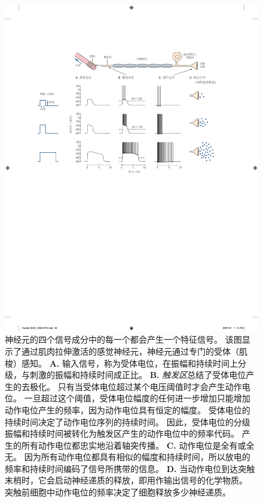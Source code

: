 \begin{figure}[htbp]
	\centering
	\includegraphics[width=1.0\linewidth]{chap03/fig_3_9}
	\caption{神经元的四个信号成分中的每一个都会产生一个特征信号。
		该图显示了通过肌肉拉伸激活的感觉神经元，神经元通过专门的受体（肌梭）感知。 
		\textbf{A.} 输入信号，称为受体电位，在振幅和持续时间上分级，与刺激的振幅和持续时间成正比。 
		\textbf{B.} \textit{触发区}总结了受体电位产生的去极化。
		只有当受体电位超过某个电压阈值时才会产生动作电位。
		一旦超过这个阈值，受体电位幅度的任何进一步增加只能增加动作电位产生的频率，因为动作电位具有恒定的幅度。
		受体电位的持续时间决定了动作电位序列的持续时间。
		因此，受体电位的分级振幅和持续时间被转化为触发区产生的动作电位中的频率代码。
		产生的所有动作电位都忠实地沿着轴突传播。
		\textbf{C.} 动作电位是全有或全无。
		因为所有动作电位都具有相似的幅度和持续时间，所以放电的频率和持续时间编码了信号所携带的信息。
		\textbf{D.} 当动作电位到达突触末梢时，它会启动神经递质的释放，即用作输出信号的化学物质。
		突触前细胞中动作电位的频率决定了细胞释放多少神经递质。}
	\label{fig:3_9}
\end{figure}


